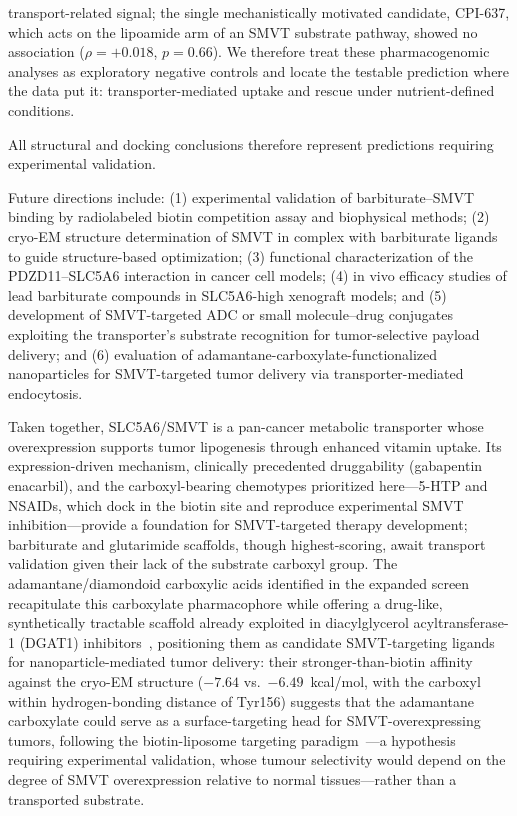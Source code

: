 \documentclass[pdflatex,sn-nature]{sn-jnl}
\begin{document}
transport-related signal; the single mechanistically motivated candidate, CPI-637, which acts on the lipoamide arm of an SMVT substrate pathway, showed no association ($\rho = +0.018$, $p = 0.66$). We therefore treat these pharmacogenomic analyses as exploratory negative controls and locate the testable prediction where the data put it: transporter-mediated uptake and rescue under nutrient-defined conditions.

All structural and docking conclusions therefore represent predictions requiring experimental validation.

Future directions include: (1) experimental validation of barbiturate--SMVT binding by radiolabeled biotin competition assay and biophysical methods; (2) cryo-EM structure determination of SMVT in complex with barbiturate ligands to guide structure-based optimization; (3) functional characterization of the PDZD11--SLC5A6 interaction in cancer cell models; (4) in vivo efficacy studies of lead barbiturate compounds in SLC5A6-high xenograft models; and (5) development of SMVT-targeted ADC or small molecule--drug conjugates exploiting the transporter's substrate recognition for tumor-selective payload delivery; and (6) evaluation of adamantane-carboxylate-functionalized nanoparticles for SMVT-targeted tumor delivery via transporter-mediated endocytosis.

Taken together, SLC5A6/SMVT is a pan-cancer metabolic transporter whose overexpression supports tumor lipogenesis through enhanced vitamin uptake. Its expression-driven mechanism, clinically precedented druggability (gabapentin enacarbil), and the carboxyl-bearing chemotypes prioritized here---5-HTP and NSAIDs, which dock in the biotin site and reproduce experimental SMVT inhibition---provide a foundation for SMVT-targeted therapy development; barbiturate and glutarimide scaffolds, though highest-scoring, await transport validation given their lack of the substrate carboxyl group. The adamantane/diamondoid carboxylic acids identified in the expanded screen recapitulate this carboxylate pharmacophore while offering a drug-like, synthetically tractable scaffold already exploited in diacylglycerol acyltransferase-1 (DGAT1) inhibitors~\cite{pagire2015}, positioning them as candidate SMVT-targeting ligands for nanoparticle-mediated tumor delivery: their stronger-than-biotin affinity against the cryo-EM structure ($-7.64$ vs.\ $-6.49$~kcal/mol, with the carboxyl within hydrogen-bonding distance of Tyr156) suggests that the adamantane carboxylate could serve as a surface-targeting head for SMVT-overexpressing tumors, following the biotin-liposome targeting paradigm~\cite{kou2020}---a hypothesis requiring experimental validation, whose tumour selectivity would depend on the degree of SMVT overexpression relative to normal tissues---rather than a transported substrate.
\end{document}
